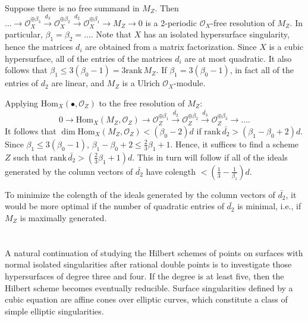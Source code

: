 \documentclass[12pt,oneside,reqno]{amsart}
\theoremstyle{definition}
\begin{document}
Suppose there is no free summand in $M_Z$. Then $\dots \to \mathcal{O}_X^{\oplus \beta_3} \xrightarrow{d_3} \mathcal{O}_X^{\oplus \beta_2} \xrightarrow{d_2} \mathcal{O}_X^{\oplus \beta_1} \to M_Z \to 0$ is a 2-periodic $\mathcal{O}_X$-free resolution of $M_Z$. In particular, $\beta_1 = \beta_2 = \dots$. Note that $X$ has an isolated hypersurface singularity, hence the matrices $d_i$ are obtained from a matrix factorization. Since $X$ is a cubic hypersurface, all of the entries of the matrices $d_i$ are at most quadratic. It also follows that $\beta_1 \leq 3(\beta_0 - 1) = 3 \mathrm{rank}\, M_Z$. If $\beta_1 = 3(\beta_0 - 1)$, in fact all of the entries of $d_2$ are linear, and $M_Z$ is a Ulrich $\mathcal{O}_X$-module. 

Applying $\mathrm{Hom}_X(\bullet, \mathcal{O}_Z)$ to the free resolution of $M_Z$:
\[
0 \to \mathrm{Hom}_X(M_Z, \mathcal{O}_Z)  \to \mathcal{O}_Z^{\oplus \beta_1} \xrightarrow{\bar{d_2}}  \mathcal{O}_Z^{\oplus \beta_2}  \xrightarrow{\bar{d_3}} \mathcal{O}_Z^{\oplus \beta_3} \to \dots.
\]
It follows that $\dim \mathrm{Hom}_X(M_Z, \mathcal{O}_Z) < (\beta_0 - 2)d$ if $\mathrm{rank} \, \bar{d_2} > (\beta_1 - \beta_0 + 2)d$. Since $\beta_1 \leq 3(\beta_0 - 1)$, $\beta_1 - \beta_0 + 2 \leq \frac{2}{3}\beta_1 + 1$. Hence, it suffices to find a scheme $Z$ such that $\mathrm{rank} \, \bar{d_2} > (\frac{2}{3}\beta_1 + 1)d$. This in turn will follow if all of the ideals generated by the column vectors of $\bar{d_2}$ have colength $< (\frac{1}{3} - \frac{1}{\beta_1})d$.

To minimize the colength of the ideals generated by the column vectors of $\bar{d_2}$, it would be more optimal if the number of quadratic entries of $\bar{d_2}$ is minimal, i.e., if $M_Z$ is maximally generated. 

\section{}
A natural continuation of studying the Hilbert schemes of points on surfaces with normal isolated singularities after rational double points is to investigate those hypersurfaces of degree three and four. If the degree is at least five, then the Hilbert scheme becomes eventually reducible. Surface singularities defined by a cubic equation are affine cones over elliptic curves, which constitute a class of simple elliptic singularities.
\end{document}
